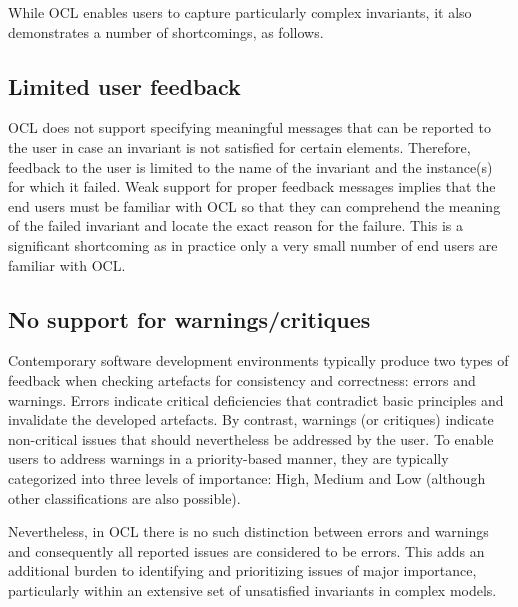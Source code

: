 While OCL enables users to capture particularly complex invariants, it also demonstrates a number of shortcomings, as follows.

\subsection{Limited user feedback}
\label{sec:Issue1}
OCL does not support specifying meaningful messages that can be reported to the user in case an invariant is not satisfied for certain elements. Therefore, feedback to the user is limited to the name of the invariant and the instance(s) for which it failed. Weak support for proper feedback messages implies that the end users must be familiar with OCL so that they can comprehend the meaning of the failed invariant and locate the exact reason for the failure. This is a significant shortcoming as in practice only a very small number of end users are familiar with OCL.

\subsection{No support for warnings/critiques}
\label{sec:Issue2}
Contemporary software development environments typically produce two types of feedback when checking artefacts for consistency and correctness: errors and warnings. Errors indicate critical deficiencies that contradict basic principles and invalidate the developed artefacts. By contrast, warnings (or critiques) indicate non-critical issues that should nevertheless be addressed by the user. To enable users to address warnings in a priority-based manner, they are typically categorized into three levels of importance: High, Medium and Low (although other classifications are also possible).

Nevertheless, in OCL there is no such distinction between errors and warnings and consequently all reported issues are considered to be errors. This adds an additional burden to identifying and prioritizing issues of major importance, particularly within an extensive set of unsatisfied invariants in complex models.

